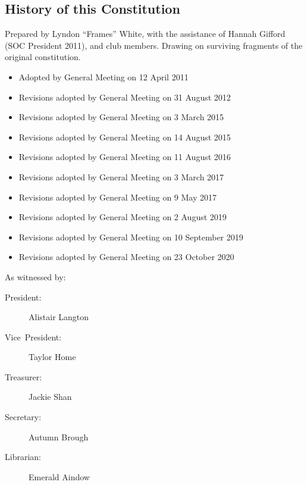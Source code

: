 \documentclass[a4paper]{article}
\begin{document}
\begin{appendices}

    \section{History of this Constitution} \label{sec:app:history}

    \noindent Prepared by Lyndon ``Frames'' White, with the assistance of Hannah Gifford (SOC President 2011), and club members. Drawing on surviving fragments of the original constitution.

    \medskip{}

    \begin{itemize}[label={}]
        \item Adopted by General Meeting on 12 April 2011
        \item Revisions adopted by General Meeting on 31 August 2012
        \item Revisions adopted by General Meeting on 3 March 2015
        \item Revisions adopted by General Meeting on 14 August 2015
        \item Revisions adopted by General Meeting on 11 August 2016
        \item Revisions adopted by General Meeting on 3 March 2017
        \item Revisions adopted by General Meeting on 9 May 2017
        \item Revisions adopted by General Meeting on 2 August 2019
        \item Revisions adopted by General Meeting on 10 September 2019
        \item Revisions adopted by General Meeting on 23 October 2020
    \end{itemize}

    \medskip{}

    \noindent As witnessed by:
    \begin{description}
        \item[{President:}] Alistair Langton
        \item[{Vice~President:}] Taylor Home
        \item[{Treasurer:}] Jackie Shan
        \item[{Secretary:}] Autumn Brough
        \item[{Librarian:}] Emerald Aindow
    \end{description}

\end{appendices}
\end{document}
